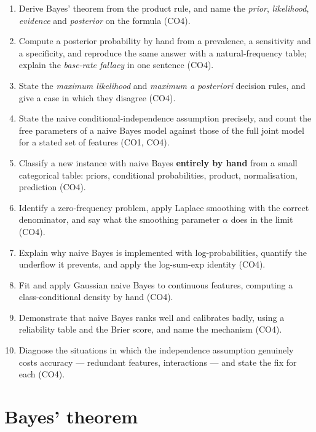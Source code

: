 \documentclass[11pt]{article}
\begin{document}
\begin{enumerate}[leftmargin=*]
  \item Derive Bayes' theorem from the product rule, and name the
    \emph{prior}, \emph{likelihood}, \emph{evidence} and \emph{posterior} on
    the formula (CO4).
  \item Compute a posterior probability by hand from a prevalence, a
    sensitivity and a specificity, and reproduce the same answer with a
    natural-frequency table; explain the \emph{base-rate fallacy} in one
    sentence (CO4).
  \item State the \emph{maximum likelihood} and \emph{maximum a posteriori}
    decision rules, and give a case in which they disagree (CO4).
  \item State the naive conditional-independence assumption precisely,
    and count the free parameters of a naive Bayes model against those of the
    full joint model for a stated set of features (CO1, CO4).
  \item Classify a new instance with naive Bayes \textbf{entirely by hand}
    from a small categorical table: priors, conditional probabilities,
    product, normalisation, prediction (CO4).
  \item Identify a zero-frequency problem, apply Laplace smoothing with the
    correct denominator, and say what the smoothing parameter $\alpha$ does
    in the limit (CO4).
  \item Explain why naive Bayes is implemented with log-probabilities,
    quantify the underflow it prevents, and apply the log-sum-exp identity
    (CO4).
  \item Fit and apply Gaussian naive Bayes to continuous features, computing
    a class-conditional density by hand (CO4).
  \item Demonstrate that naive Bayes ranks well and calibrates badly, using
    a reliability table and the Brier score, and name the mechanism (CO4).
  \item Diagnose the situations in which the independence assumption
    genuinely costs accuracy --- redundant features, interactions --- and
    state the fix for each (CO4).
\end{enumerate}

\section{Bayes' theorem}
\label{sec:bayes}
\end{document}
